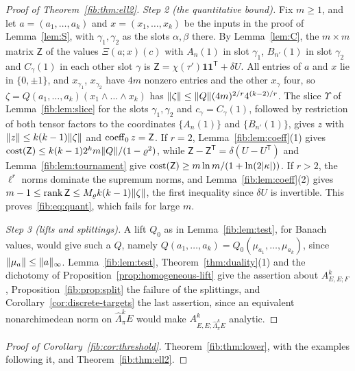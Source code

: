 \begin{proof}[Proof of Theorem~\ref{fib:thm:ell2}]
\emph{Step 2 (the quantitative bound).} Fix $m\ge1$, and let $a=(a_1,\dots,a_k)$ and $x=(x_1,\dots,x_k)$ be the inputs in
the proof of Lemma~\ref{lem:S}, with $\gamma_1,\gamma_2$ as the slots $\alpha,\beta$ there. By Lemma~\ref{lem:C}, the
$m\times m$ matrix $\mathsf Z$ of the values $\Xi(a;x)(c)$ with $A_n(1)$ in slot $\gamma_1$, $B_{n'}(1)$ in slot
$\gamma_2$ and $C_\gamma(1)$ in each other slot $\gamma$ is $\mathsf Z=\chi(\tau')\mathbf 1\mathbf 1^{\mathsf T}+\delta U$.
All entries of $a$ and $x$ lie in $\{0,\pm1\}$, and $x_{\gamma_1}$, $x_{\gamma_2}$ have $4m$ nonzero entries and the
other $x_\gamma$ four, so $\zeta=Q(a_1,\dots,a_k)(x_1\wedge\dots\wedge x_k)$ has $\lVert \zeta\rVert\le\lVert Q\rVert(4m)^{2/r}4^{(k-2)/r}$.
The slice $\Upsilon$ of Lemma~\ref{fib:lem:slice} for the slots $\gamma_1,\gamma_2$ and $c_\gamma=C_\gamma(1)$, followed by
restriction of both tensor factors to the coordinates $\{A_n(1)\}$ and $\{B_{n'}(1)\}$, gives $z$ with
$\lVert z\rVert\le k(k-1)\lVert \zeta\rVert$ and $\operatorname{coeff}_0z=\mathsf Z$. If $r=2$, Lemma~\ref{fib:lem:coeff}(1) gives
$\operatorname{cost}(\mathsf Z)\le k(k-1)2^km\lVert Q\rVert/(1-\varrho^2)$, while $\mathsf Z-\mathsf Z^{\mathsf T}=\delta(U-U^{\mathsf T})$
and Lemma~\ref{fib:lem:tournament} give $\operatorname{cost}(\mathsf Z)\ge m\ln m/(1+\ln(2\lvert \kappa\rvert))$. If $r>2$, the
$\ell^r$ norms dominate the supremum norms, and Lemma~\ref{fib:lem:coeff}(2) gives
$m-1\le\operatorname{rank}\mathsf Z\le M_\varrho k(k-1)\lVert \zeta\rVert$, the first inequality since $\delta U$ is invertible. This
proves~\eqref{fib:eq:quant}, which fails for large $m$.

\emph{Step 3 (lifts and splittings).} A lift $Q_0$ as in Lemma~\ref{fib:lem:test}, for Banach values, would give such a
$Q$, namely $Q(a_1,\dots,a_k)=Q_0(\mu_{a_1},\dots,\mu_{a_k})$, since $\lVert \mu_a\rVert\le\lVert a\rVert_\infty$.
Lemma~\ref{fib:lem:test}, Theorem~\ref{thm:duality}(1) and the dichotomy of Proposition~\ref{prop:homogeneous-lift} give
the assertion about $A^k_{E,E;F}$, Proposition~\ref{fib:prop:split} the failure of the splittings, and
Corollary~\ref{cor:discrete-targets} the last assertion, since an equivalent nonarchimedean norm on
$\widehat\Lambda^k_\pi E$ would make $A^k_{E,E;\widehat\Lambda^k_\pi E}$ analytic.
\end{proof}

\begin{proof}[Proof of Corollary~\ref{fib:cor:threshold}]
Theorem~\ref{fib:thm:lower}, with the examples following it, and Theorem~\ref{fib:thm:ell2}.
\end{proof}

